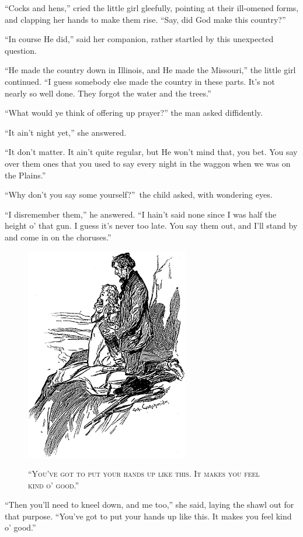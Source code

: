 \documentclass[12pt,english,oneside]{book}
\newcommand{\noun}[1]{\textsc{#1}}
\begin{document}
{}``Cocks and hens,'' cried the little girl gleefully, pointing
at their ill-omened forms, and clapping her hands to make them rise.
{}``Say, did God make this country?''

{}``In course He did,'' said her companion, rather startled by this
unexpected question.

{}``He made the country down in Illinois, and He made the Missouri,''
the little girl continued. {}``I guess somebody else made the country
in these parts. It's not nearly so well done. They forgot the water
and the trees.''

{}``What would ye think of offering up prayer?'' the man asked diffidently.

{}``It ain't night yet,'' she answered.

{}``It don't matter. It ain't quite regular, but He won't mind that,
you bet. You say over them ones that you used to say every night in
the waggon when we was on the Plains.''

{}``Why don't you say some yourself?''\ the child asked, with wondering
eyes.

{}``I disremember them,'' he answered. {}``I hain't said none since
I was half the height o' that gun. I guess it's never too late. You
say them out, and I'll stand by and come in on the choruses.''

%
\begin{figure}[htbp]
\noindent \begin{center}\includegraphics{images/study10-stud-14.png}\end{center}

\noindent \begin{center}\noun{{}``You've got to put your hands
up like this. It makes you feel kind o' good.''}\end{center}
\end{figure}
{}``Then you'll need to kneel down, and me too,'' she said, laying
the shawl out for that purpose. {}``You've got to put your hands
up like this. It makes you feel kind o' good.''
\end{document}
